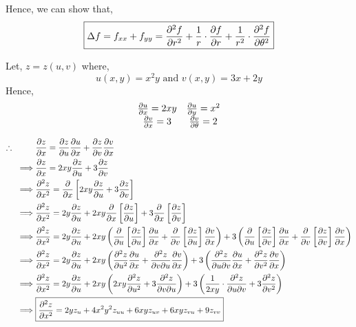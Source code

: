 \documentclass[Analysis-3]{subfiles}
\begin{document}
Hence, we can show that,
\[ \boxed{\Delta f = f_{xx} + f_{yy} = \pdv[2]{f}{r} + \frac{1}{r}\cdot\pdv{f}{r} + \frac{1}{r^2}\cdot\pdv[2]{f}{\theta}} \]

\begin{Eg}{}{}
	Let, $z = z(u,v)$ where, \[ u(x,y) = x^2y \text{ and } v(x,y) = 3x + 2y \]
	Hence, \[\begin{matrix}
			\pdv{u}{x} = 2xy & \pdv{u}{y} = x^2    \\
			\pdv{v}{x} = 3   & \pdv{v}{\theta} = 2
		\end{matrix}\]

	\begin{align*}
		\therefore \hspace{1cm} & \pdv{z}{x} = \pdv{z}{u} \pdv{u}{x} + \pdv{z}{v} \pdv{v}{x}                                                                                                                                                                                                  \\
		\implies                & \pdv{z}{x} = 2xy \pdv{z}{u} + 3 \pdv{z}{v}                                                                                                                                                                                                                  \\
		\implies                & \pdv[2]{z}{x} = \pdv{}{x} \left[ 2xy \pdv{z}{u} + 3 \pdv{z}{v} \right]                                                                                                                                                                                      \\
		\implies                & \pdv[2]{z}{x} = 2y \pdv{z}{u} + 2xy \pdv{}{x} \left[\pdv{z}{u}\right]  + 3\pdv{}{x} \left[\pdv{z}{v}\right]                                                                                                                                                 \\
		\implies                & \pdv[2]{z}{x} = 2y \pdv{z}{u} + 2xy \left(\pdv{}{u} \left[\pdv{z}{u}\right] \pdv{u}{x} + \pdv{}{v} \left[\pdv{z}{u}\right] \pdv{v}{x}\right)  + 3\left( \pdv{}{u} \left[\pdv{z}{v}\right] \pdv{u}{x} + \pdv{}{v} \left[\pdv{z}{v}\right] \pdv{v}{x} \right) \\
		\implies                & \pdv[2]{z}{x} = 2y \pdv{z}{u} + 2xy \left(\pdv[2]{z}{u} \pdv{u}{x} + \pdv{z}{v}{u} \pdv{v}{x}\right)  + 3\left( \pdv{z}{u}{v} \pdv{u}{x} + \pdv[2]{z}{v} \pdv{v}{x}\right)                                                                                  \\
		\implies                & \pdv[2]{z}{x} = 2y \pdv{z}{u} + 2xy \left(2xy \pdv[2]{z}{u}  + 3 \pdv{z}{v}{u}\right)  + 3\left( \frac{1}{2xy}\cdot\pdv{z}{u}{v}  + 3\pdv[2]{z}{v}\right)                                                                                                   \\
		\implies                & \boxed{\pdv[2]{z}{x} = 2y z_u + 4x^2y^2z_{uu}+ 6xy z_{uv} + 6xy z_{vu} + 9z_{vv}}
	\end{align*}

\end{Eg}
\end{document}

